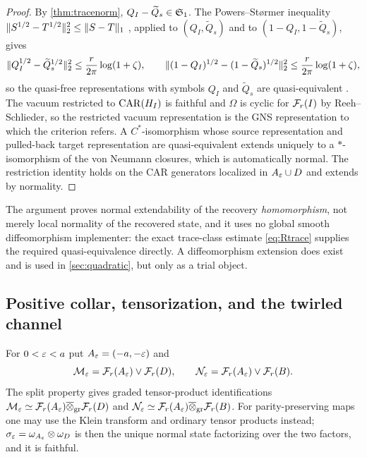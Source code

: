 \begin{proof}
By \cref{thm:tracenorm}, $Q_I-\widetilde Q_s\in\mathfrak S_1$.  The Powers--St\o rmer
inequality $\lVert S^{1/2}-T^{1/2}\rVert_2^2\le\lVert S-T\rVert_1$ \cite[Lemma~4.1]{PS70},
applied to $(Q_I,\widetilde Q_s)$ and to $(1-Q_I,1-\widetilde Q_s)$, gives
\begin{equation}\label{eq:PS}
 \lVert Q_I^{1/2}-\widetilde Q_s^{1/2}\rVert_2^2\le\frac r{2\pi}\log(1+\zeta),\qquad
 \lVert (1-Q_I)^{1/2}-(1-\widetilde Q_s)^{1/2}\rVert_2^2\le\frac r{2\pi}\log(1+\zeta),
\end{equation}
so the quasi-free representations with symbols $Q_I$ and $\widetilde Q_s$ are
quasi-equivalent \cite{PS70,ArakiCAR}.  The vacuum restricted to $\mathrm{CAR}(H_I)$ is
faithful and $\Omega$ is cyclic for $\mathcal F_r(I)$ by Reeh--Schlieder, so the
restricted vacuum representation is the GNS representation to which the criterion
refers.  A $C^*$-isomorphism whose source representation and pulled-back target
representation are quasi-equivalent extends uniquely to a $*$-isomorphism of the
von Neumann closures, which is automatically normal.  The restriction identity
holds on the CAR generators localized in $A_\varepsilon\cup D$ and extends by normality.
\end{proof}

\begin{remark}
The argument proves normal extendability of the recovery \emph{homomorphism}, not
merely local normality of the recovered state, and it uses no global smooth
diffeomorphism implementer: the exact trace-class estimate \eqref{eq:Rtrace}
supplies the required quasi-equivalence directly.  A diffeomorphism extension
does exist and is used in \cref{sec:quadratic}, but only as a trial object.
\end{remark}

\subsection{Positive collar, tensorization, and the twirled channel}
For $0<\varepsilon<a$ put $A_\varepsilon=(-a,-\varepsilon)$ and
\begin{equation}\label{eq:collar-algebras}
 \mathcal M_\varepsilon=\mathcal F_r(A_\varepsilon)\vee\mathcal F_r(D),\qquad
 \mathcal N_\varepsilon=\mathcal F_r(A_\varepsilon)\vee\mathcal F_r(B).
\end{equation}
The split property gives graded tensor-product identifications
$\mathcal M_\varepsilon\simeq\mathcal F_r(A_\varepsilon)\overline\otimes_{\rm gr}\mathcal F_r(D)$ and
$\mathcal N_\varepsilon\simeq\mathcal F_r(A_\varepsilon)\overline\otimes_{\rm gr}\mathcal F_r(B)$.  For
parity-preserving maps one may use the Klein transform and ordinary tensor
products instead; $\sigma_\varepsilon=\omega_{A_\varepsilon}\otimes\omega_D$ is then the unique
normal state factorizing over the two factors, and it is faithful.

